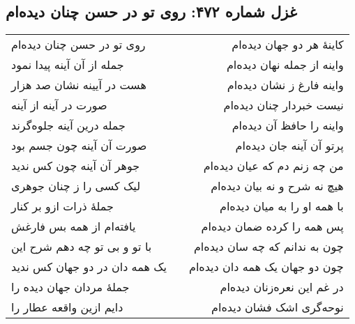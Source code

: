 \begin{center}
\section*{غزل شماره ۴۷۲: روی تو در حسن چنان دیده‌ام}
\label{sec:472}
\begin{longtable}{l p{0.5cm} r}
روی تو در حسن چنان دیده‌ام
&&
کاینهٔ هر دو جهان دیده‌ام
\\
جمله از آن آینه پیدا نمود
&&
واینه از جمله نهان دیده‌ام
\\
هست در آیینه نشان صد هزار
&&
واینه فارغ ز نشان دیده‌ام
\\
صورت در آینه از آینه
&&
نیست خبردار چنان دیده‌ام
\\
جمله درین آینه جلوه‌گرند
&&
واینه را حافظ آن دیده‌ام
\\
صورت آن آینه چون جسم بود
&&
پرتو آن آینه جان دیده‌ام
\\
جوهر آن آینه چون کس ندید
&&
من چه زنم دم که عیان دیده‌ام
\\
لیک کسی را ز چنان جوهری
&&
هیچ نه شرح و نه بیان دیده‌ام
\\
جملهٔ ذرات ازو بر کنار
&&
با همه او را به میان دیده‌ام
\\
یافته‌ام از همه بس فارغش
&&
پس همه را کرده ضمان دیده‌ام
\\
با تو و بی تو چه دهم شرح این
&&
چون به ندانم که چه سان دیده‌ام
\\
یک همه دان در دو جهان کس ندید
&&
چون دو جهان یک همه دان دیده‌ام
\\
جملهٔ مردان جهان دیده را
&&
در غم این نعره‌زنان دیده‌ام
\\
دایم ازین واقعه عطار را
&&
نوحه‌گری اشک فشان دیده‌ام
\\
\end{longtable}
\end{center}
